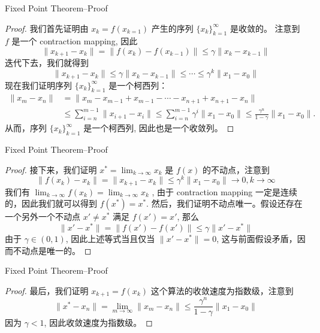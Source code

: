 \documentclass[aspectratio=169]{beamer}
\begin{document}
\begin{frame}{Fixed Point Theorem--Proof}
    \begin{proof}
        我们首先证明由 $x_k=f(x_{k=1})$ 产生的序列 $\{x_k\}_{k=1}^{\infty}$ 是收敛的。
        注意到 $f$ 是一个 contraction mapping, 因此
        \begin{equation}
            \|x_{k+1}-x_k\| = \|f(x_k)-f(x_{k-1})\|\leq \gamma \|x_k-x_{k-1}\|
        \end{equation}
        迭代下去，我们就得到
        \begin{equation}
            \|x_{k+1}-x_k\|\leq \gamma \|x_k-x_{k-1}\|\leq\cdots\leq \gamma^k \|x_1-x_{0}\|
        \end{equation}
        现在我们证明序列 $\{x_k\}_{k=1}^{\infty}$ 是一个柯西列：
        \begin{equation}
        \begin{aligned}
        \|x_m-x_n\| &= \|x_m-x_{m-1}+x_{m-1}-\cdots-x_{n+1}+x_{n+1}-x_n\|\\
        &\leq \sum_{i=n}^{m-1}\|x_{i+1}-x_i\|\leq \sum_{i=n}^{m-1}\gamma^i \|x_{1}-x_0\|\leq \frac{\gamma^n}{1-\gamma}\|x_{1}-x_0\|.
        \end{aligned}
        \end{equation}
        从而，序列 $\{x_k\}_{k=1}^{\infty}$ 是一个柯西列, 因此也是一个收敛列。
    \end{proof}
\end{frame}

\begin{frame}{Fixed Point Theorem--Proof}
    \begin{proof}
        接下来，我们证明 $x^*=\lim_{k\to\infty}x_k$ 是 $f(x)$ 的不动点，注意到
        \begin{equation}
            \|f(x_k)-x_k\| = \|x_{k+1}-x_k\|\leq \gamma^k\|x_1-x_0\| \to 0, k\to\infty
        \end{equation}
        我们有 $\lim_{k\to\infty}f(x_k)=\lim_{k\to\infty}x_k$ , 由于 contraction mapping 一定是连续的，因此我们就可以得到 $f(x^*)=x^*$.
        然后，我们证明不动点唯一。假设还存在一个另外一个不动点 $x'\neq x^*$ 满足 $f(x')=x'$, 那么
        \begin{equation}
            \|x'-x^*\| = \|f(x')-f(x')\| \leq \gamma \|x'-x^*\|
        \end{equation}
        由于 $\gamma\in(0,1)$, 因此上述等式当且仅当 $\|x'-x^*\|=0$, 这与前面假设矛盾，因而不动点是唯一的。
    \end{proof}
\end{frame}

\begin{frame}{Fixed Point Theorem--Proof}
    \begin{proof}
        最后，我们证明 $x_{k+1}=f(x_k)$ 这个算法的收敛速度为指数级，注意到
        \begin{equation}
            \|x^*-x_n\| = \lim_{m\to\infty}\|x_m-x_n\| \leq \frac{\gamma^n}{1-\gamma}\|x_1-x_0\|
        \end{equation}
        因为 $\gamma <1$, 因此收敛速度为指数级。
    \end{proof}
\end{frame}
\end{document}
